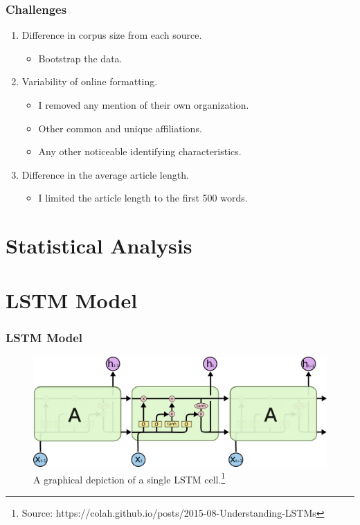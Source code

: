 \documentclass{beamer}
\begin{document}
    \begin{frame}
    	\frametitle{Challenges}
		\begin{enumerate}
			\item Difference in corpus size from each source. 
			\begin{itemize}
				\item Bootstrap the data. 
			\end{itemize}  
		
		    \item Variability of online formatting. 
		    \begin{itemize}
		    	\item I removed any mention of their own organization.
		    	\item Other common and unique affiliations. 
		    	\item Any other noticeable identifying characteristics.
		    \end{itemize}   
	    
	        \item Difference in the average article length. 
	        \begin{itemize}
	        	\item I limited the article length to the first 500 words.
	        \end{itemize}
		\end{enumerate}
    \end{frame}
    


\section{Statistical Analysis}
	

\section{LSTM Model}

    \begin{frame}
    	\frametitle{LSTM Model}
    	\begin{figure}[H]
    		\includegraphics[width=\textwidth]{figures/images/lstm-math.png}
    		\caption{A graphical depiction of a single LSTM cell.\footnote{Source: https://colah.github.io/posts/2015-08-Understanding-LSTMs}}
    	\end{figure}
    \end{frame}
\end{document}
